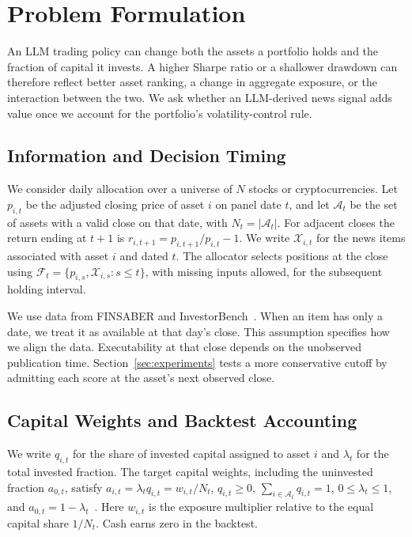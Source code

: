 \section{Problem Formulation}
\label{sec:problem}

An LLM trading policy can change both the assets a portfolio holds and the fraction of capital it invests. A higher Sharpe ratio or a shallower drawdown can therefore reflect better asset ranking, a change in aggregate exposure, or the interaction between the two. We ask whether an LLM-derived news signal adds value once we account for the portfolio's volatility-control rule.

\subsection{Information and Decision Timing}

We consider daily allocation over a universe of $N$ stocks or cryptocurrencies. Let $p_{i,t}$ be the adjusted closing price of asset $i$ on panel date $t$, and let $\mathcal{A}_t$ be the set of assets with a valid close on that date, with $N_t=|\mathcal{A}_t|$. For adjacent closes the return ending at $t+1$ is $r_{i,t+1}=p_{i,t+1}/p_{i,t}-1$. We write $\mathcal{X}_{i,t}$ for the news items associated with asset $i$ and dated $t$. The allocator selects positions at the close using $\mathcal{F}_t=\{p_{i,s},\mathcal{X}_{i,s}:s\leq t\}$, with missing inputs allowed, for the subsequent holding interval.

We use data from FINSABER and InvestorBench~\cite{li2025finsaber,li2024investorbench}. When an item has only a date, we treat it as available at that day’s close. This assumption specifies how we align the data. Executability at that close depends on the unobserved publication time. Section~\ref{sec:experiments} tests a more conservative cutoff by admitting each score at the asset's next observed close.

\subsection{Capital Weights and Backtest Accounting}

We write $q_{i,t}$ for the share of invested capital assigned to asset $i$ and $\lambda_t$ for the total invested fraction. The target capital weights, including the uninvested fraction $a_{0,t}$, satisfy
$a_{i,t}=\lambda_t q_{i,t}=w_{i,t}/N_t$, $q_{i,t}\geq 0$, $\sum_{i\in\mathcal{A}_t} q_{i,t}=1$, $0\leq\lambda_t\leq1$, and $a_{0,t}=1-\lambda_t$~.
Here $w_{i,t}$ is the exposure multiplier relative to the equal capital share $1/N_t$. Cash earns zero in the backtest.

